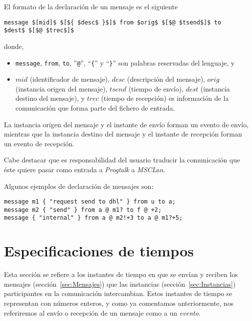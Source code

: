 El formato de la declaración de un mensaje es el siguiente
\begin{center}
  \begin{minipage}{0.75\linewidth}
\begin{lstlisting}[mathescape]
message $[mid]$ $[${ $desc$ }$]$ from $orig$ $[$@ $tsend$]$ to
$dest$ $[$@ $trec$]$
\end{lstlisting}
  \end{minipage}
\end{center}
donde,
\begin{itemize}
\item \lstinline{message}, \lstinline{from}, \lstinline{to},
  ''\lstinline{@}'', ``\lstinline!{!'' y ``\lstinline!}!'' son
  palabras reservadas del lenguaje, y
\item $mid$ (identificador de mensaje), $desc$ (descripción del mensaje), $orig$
  (instancia origen del mensaje), $tsend$ (tiempo de envío), $dest$
  (instancia destino del mensaje), y $trec$ (tiempo de recepción)
  es información de la comunicación que forma parte del fichero de entrada.
\end{itemize}

La instancia origen del mensaje y el instante de envío forman un
evento de envío, mientras que la instancia destino del mensaje y el
instante de recepción forman un evento de recepción.

Cabe destacar que es responsabilidad del usuario traducir la
comunicación que éste quiere pasar como entrada a \textit{Progtalk} a
\textit{MSCLan}.

Algunos ejemplos de declaración de mensajes son:

\begin{lstlisting}
message m1 { "request send to dhl" } from u to a;
message m2 { "send" } from a @ m1? to f @ +2;
message { "internal" } from a @ m2!+3 to a @ m1?+5;
\end{lstlisting}

\section{Especificaciones de tiempos}
\label{sec:Tiempos}

Esta sección se refiere a los instantes de tiempo en que se envían y
reciben los mensajes (sección~\ref{sec:Mensajes}) que las
instancias (sección~\ref{sec:Instancias}) participantes en la
comunicación intercambian. Estos instantes de tiempo se representan
con números enteros, y como ya comentamos anteriormente, nos
referiremos al envío o recepción de un mensaje como a un
\textit{evento}.

